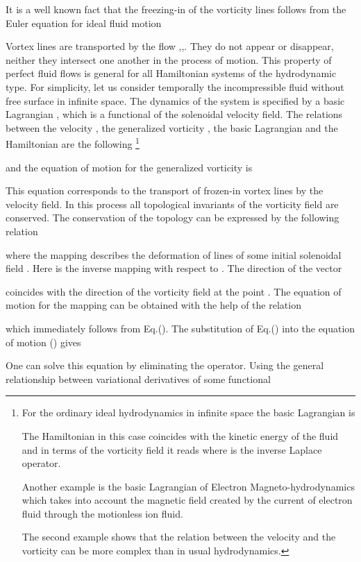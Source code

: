 It is a well known fact that the freezing-in of the vorticity lines 
follows from the Euler equation for ideal fluid motion

Vortex lines are transported by the flow ,,. 
They do not appear or disappear, 
neither they intersect one another in the process of motion.
This property of perfect fluid flows is general for all Hamiltonian systems of 
the hydrodynamic type.
For simplicity, let us consider temporally the incompressible fluid without 
free surface in infinite space. The dynamics of the system is specified
by a basic Lagrangian , which is a functional of the solenoidal velocity
field. The relations between the velocity ,
the generalized vorticity , the basic Lagrangian  and
the Hamiltonian  are the following \footnote{
For the ordinary ideal hydrodynamics in infinite space the basic Lagrangian is

The Hamiltonian in this case coincides 
with the kinetic energy of the fluid and in terms of the vorticity field it reads
where  is the inverse Laplace operator.

Another example is the basic Lagrangian of Electron Magneto-hydrodynamics
which takes into account the magnetic field created by the current of electron 
fluid through the motionless ion fluid.



The second example shows that the relation between the velocity and the
vorticity can be more complex than in usual hydrodynamics.
}



and the equation of motion for the generalized vorticity is

This equation corresponds to the transport of frozen-in vortex lines by the 
velocity field. In this process all topological invariants  
of the vorticity field are conserved. 
The conservation of the topology can be expressed by 
the following relation 

where the mapping  describes the deformation of lines of
some initial solenoidal field . Here
 is the inverse mapping with respect to
. 
The direction of the vector 

coincides with the direction of the vorticity field at the point 
. The equation of motion for the mapping 
 can be obtained with the help of the relation

which immediately follows from Eq.(). 
The substitution of Eq.()
into the equation of motion () gives 

One can solve this equation by eliminating the  operator.
Using the general relationship between variational derivatives 
of some functional 

